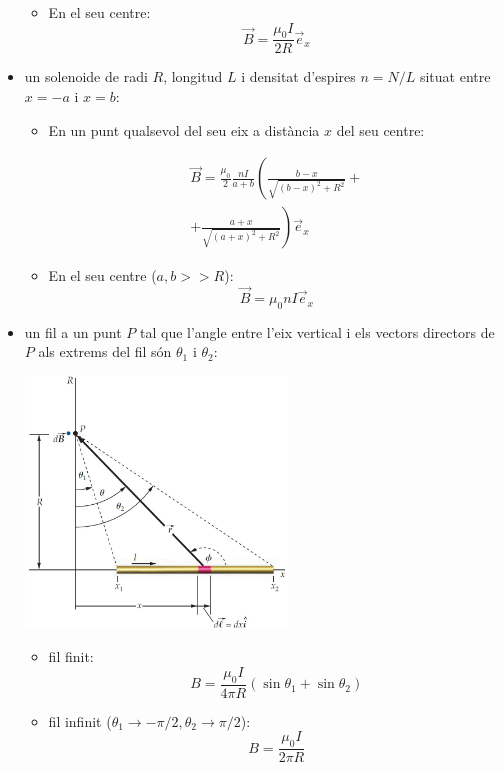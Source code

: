 \documentclass[../../../main.tex]{subfiles}
\begin{document}
\begin{multicols}{2}
\begin{itemize}
\begin{itemize}
        \item En el seu centre: $$\Vec{B}=\frac{\mu_0I}{2R}\Vec{e}_x$$
    \end{itemize}
    \item un solenoide de radi $R$, longitud $L$ i densitat d'espires $n=N/L$ situat entre $x=-a$ i $x=b$:
    \begin{itemize}
        \item En un punt qualsevol del seu eix a distància $x$ del seu centre:
        \begin{footnotesize}
            \begin{multline*} \Vec{B}=\frac{\mu_0}{2}\frac{nI}{a+b}\left(\frac{b-x}{\sqrt{(b-x)^2+R^2}}+\right.\\\left.+\frac{a+x}{\sqrt{(a+x)^2+R^2}}\right)\Vec{e}_x
            \end{multline*}
        \end{footnotesize}
        \item En el seu centre ($a,b>>R$): $$\Vec{B}=\mu_0 nI\Vec{e}_x$$
    \end{itemize}
    \item un fil a un punt $P$ tal que l'angle entre l'eix vertical i els vectors directors de $P$ als extrems del fil són $\theta_1$ i $\theta_2$:\newline
    \begin{minipage}{\linewidth}
        \centering
        \includegraphics[width=7cm]{Physics/1st/Electricity_and_magnetism/Images/fil.jpg} 
    \end{minipage}
    \begin{itemize}
        \item fil finit: $$B=\frac{\mu_0I}{4\pi R}(\sin\theta_1+\sin\theta_2)$$
        \item fil infinit ($\theta_1\to-\pi/2,\theta_2\to\pi/2$): $$B=\frac{\mu_0I}{2\pi R}$$
    \end{itemize}

\end{itemize}
\end{multicols}
\end{document}
